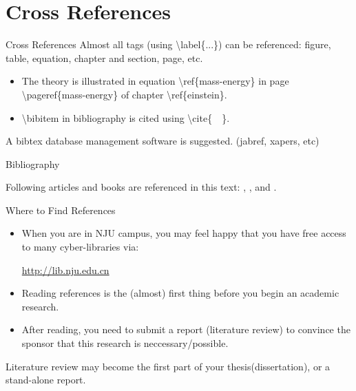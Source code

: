 \documentclass[10pt]{beamer}
\begin{document}
\section{Cross References}
\begin{frame}[t]{Cross References}
    Almost all tags (using \textbackslash label\{...\})
    can be referenced: figure, table, equation,
    chapter and section, page, etc.
\begin{itemize}
    \item The theory is illustrated in equation
        \alert{\textbackslash ref\{mass-energy\}} in page
        \alert{\textbackslash pageref\{mass-energy\}} of chapter
        \alert{\textbackslash ref\{einstein\}}.

    \item \textbackslash bibitem in bibliography is cited using
        \textbackslash cite\{\ \ \}.
\end{itemize}
A bibtex database management software is suggested.
(jabref, xapers, etc)
\end{frame}

\begin{frame}{Bibliography}

 Following articles and books are referenced in this text:
    \cite{Knuth_texbook}, \cite{texmanual}, \cite{David_tex_land} and
    \cite{oetiker2015}.

    
    
\end{frame}

\begin{frame}[t]{Where to Find References}
\begin{itemize}
    \item When you are in NJU campus, you may feel happy that you have
    free access to many cyber-libraries via:

    \url{http://lib.nju.edu.cn} \\[2ex]
    \item Reading references is the (almost) first thing before
        you begin an academic research.
    \item After reading, you need to submit a report (literature review)
        to convince the sponsor that this research is neccessary/possible.
\end{itemize}
Literature review may become the first part of your thesis(dissertation),
or a stand-alone report.
\end{frame}
\end{document}
